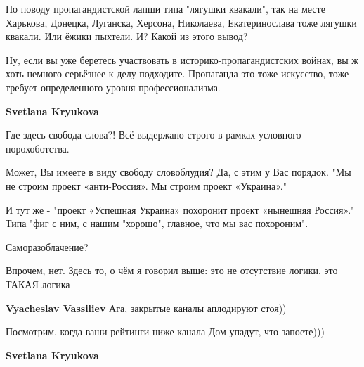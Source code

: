 \begin{itemize}
\begin{itemize}
По поводу пропагандистской лапши типа "лягушки квакали", так на месте Харькова,
Донецка, Луганска, Херсона, Николаева, Екатеринослава тоже лягушки квакали. Или
ёжики пыхтели. И? Какой из этого вывод?

Ну, если вы уже беретесь участвовать в историко-пропагандистских войнах, вы ж
хоть немного серьёзнее к делу подходите. Пропаганда это тоже искусство, тоже
требует определенного уровня профессионализма.

 
\textbf{Svetlana Kryukova} 

Где здесь свобода слова?! Всё выдержано строго в рамках условного
порохоботства.

Может, Вы имеете в виду свободу словоблудия? Да, с этим у Вас порядок. "Мы не
строим проект «анти-Россия». Мы строим проект «Украина»." 

И тут же - "проект «Успешная Украина» похоронит проект «нынешняя Россия»." Типа
"фиг с ним, с нашим "хорошо", главное, что мы вас похороним".

Саморазоблачение?

Впрочем, нет. Здесь то, о чём я говорил выше: это не отсутствие логики, это
ТАКАЯ логика


 
\textbf{Vyacheslav Vassiliev} Ага, закрытые каналы аплодируют стоя))

 
Посмотрим, когда ваши рейтинги ниже канала Дом упадут, что запоете)))

 
\textbf{Svetlana Kryukova} 


\end{itemize}
\end{itemize}
